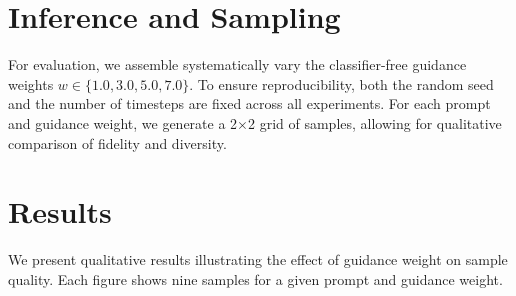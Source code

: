 \documentclass[11pt,a4paper]{article}
\begin{document}
\newpage


\section{Inference and Sampling}

For evaluation, we assemble systematically vary the classifier-free guidance weights $w \in \{1.0, 3.0, 5.0, 7.0\}$. To ensure reproducibility, both the random seed and the number of timesteps are fixed across all experiments. For each prompt and guidance weight, we generate a 2$\times$2 grid of samples, allowing for qualitative comparison of fidelity and diversity.


\section{Results}

We present qualitative results illustrating the effect of guidance weight on sample quality. Each figure shows nine samples for a given prompt and guidance weight.
\end{document}
